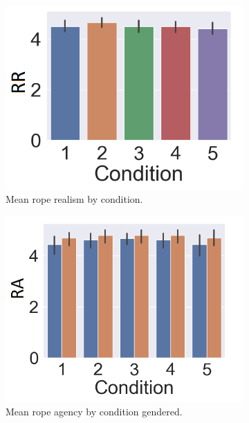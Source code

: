 \begin{figure}[H]
\begin{subfigure}[b]{0.3\textwidth}
     \includegraphics[scale=0.35]{Files/Plots/rrcond.png}
     \caption{Mean rope realism by condition.}
     \label{fig:ropeRealCond}
 \end{subfigure}
 \hspace{-5mm}
  \begin{subfigure}[b]{0.3\textwidth}
     \centering
     \includegraphics[scale=0.3]{Files/Plots/rocond_gen.png}
     \caption{Mean rope agency by condition gendered.}
     \label{fig:ropeOwnCondGend}
 \end{subfigure}
   \begin{subfigure}[b]{0.3\textwidth}
     \centering

\end{subfigure}
\end{figure}
